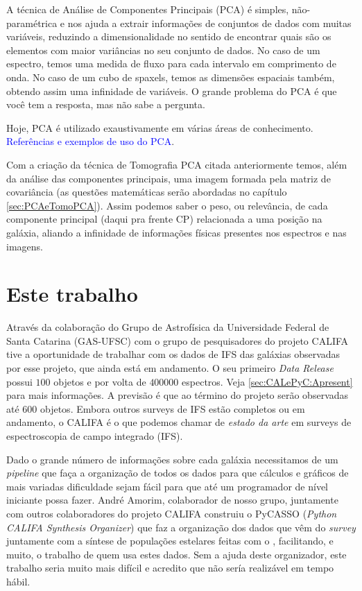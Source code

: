 A técnica de Análise de Componentes Principais (PCA) é simples, não-paramétrica
e nos ajuda a extrair informações de conjuntos de dados com muitas variáveis,
reduzindo a dimensionalidade no sentido de encontrar quais são os elementos com
maior variâncias no seu conjunto de dados. No caso de um espectro, temos uma
medida de fluxo para cada intervalo em comprimento de onda. No caso de um cubo
de spaxels, temos as dimensões espaciais também, obtendo assim uma infinidade de
variáveis. O grande problema do PCA é que você tem a resposta, mas não sabe a
pergunta.

Hoje, PCA é utilizado exaustivamente em várias áreas de conhecimento. \ojo
\citneed \textcolor{blue}{Referências e exemplos de uso do PCA}.

Com a criação da técnica de Tomografia PCA citada anteriormente temos, além da
análise das componentes principais, uma imagem formada pela matriz de
covariância (as questões matemáticas serão abordadas no
capítulo \ref{sec:PCAeTomoPCA}). Assim podemos saber o peso, ou relevância, de
cada componente principal (daqui pra frente CP) relacionada a uma posição na
galáxia, aliando a infinidade de informações físicas presentes nos espectros e
nas imagens.

\section{Este trabalho}
\label{sec:Intro:ThisWork}

Através da colaboração do Grupo de Astrofísica da Universidade Federal de Santa
Catarina (GAS-UFSC) com o grupo de pesquisadores do projeto CALIFA tive a
oportunidade de trabalhar com os dados de IFS das galáxias observadas por esse
projeto, que ainda está em andamento. O seu primeiro {\em Data Release}
\citep{Husemann2013} possui $100$ objetos e por volta de $400000$ espectros.
Veja \ref{sec:CALePyC:Apresent} para mais informações. A previsão é que ao
término do projeto serão observadas até $600$ objetos. Embora outros surveys de
IFS estão completos ou em andamento, o CALIFA é o que podemos chamar de {\em
estado da arte} em surveys de espectroscopia de campo integrado (IFS).

Dado o grande número de informações sobre cada galáxia necessitamos de um {\em
pipeline} que faça a organização de todos os dados para que cálculos e gráficos
de mais variadas dificuldade sejam fácil para que até um programador de nível
iniciante possa fazer. André Amorim, colaborador de nosso grupo, juntamente com
outros colaboradores do projeto CALIFA construiu o PyCASSO ({\em Python CALIFA
\starlight Synthesis Organizer}) \citep{CidFernandes2013a} que faz a organização
dos dados que vêm do {\em survey} juntamente com a síntese de populações
estelares feitas com o \starlight, facilitando, e muito, o trabalho de quem usa
estes dados. Sem a ajuda deste organizador, este trabalho seria muito mais
difícil e acredito que não sería realizável em tempo hábil.

